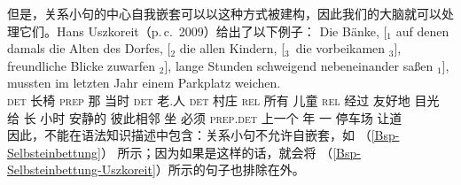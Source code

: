 但是，关系小句的中心自我嵌套可以以这种方式被建构，因此我们的大脑就可以处理它们。Hans Uszkoreit（p.\,c.\ 2009）给出了以下例子：
\ea
\label{Bsp-Selbsteinbettung-Uszkoreit}
\gll Die Bänke, [$_1$ auf denen damals die Alten des Dorfes, [$_2$ die allen Kindern, [$_3$~die vorbeikamen $_3$], freundliche Blicke zuwarfen $_2$], 
lange Stunden schweigend nebeneinander saßen $_1$], mussten im letzten Jahr einem Parkplatz weichen.\\
\textsc{det} 长椅 {} \textsc{prep} 那 当时 \textsc{det} 老.人 \textsc{det} 村庄 {} \textsc{rel} 所有 儿童 \hspaceThis{[$_3$~}\textsc{rel} 经过 {} 友好地 目光 给 {}
长 小时 安静的 彼此相邻 坐 {} 必须 \textsc{prep}.\textsc{det} 上一个 年 一 停车场 让道\\
\z
因此，不能在语法知识描述中包含：关系小句不允许自嵌套，如 （\ref{Bsp-Selbsteinbettung}）  所示；因为如果是这样的话，就会将 （\ref{Bsp-Selbsteinbettung-Uszkoreit}）所示的句子也排除在外。

